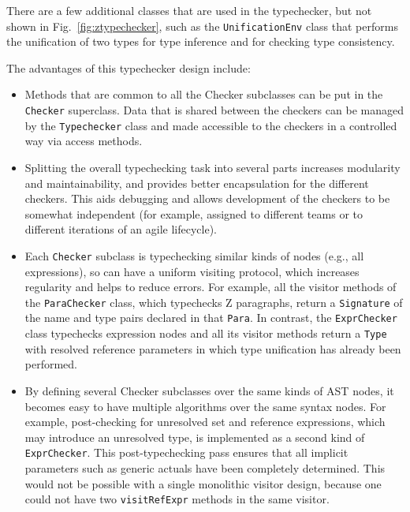 \documentclass{llncs}
\begin{document}
There are a few additional classes that are used in the typechecker,
but not shown in Fig.~\ref{fig:ztypechecker}, such as the
\texttt{UnificationEnv} class that performs
the unification of two types for type inference and for checking type
consistency.

The advantages of this typechecker design include:
\begin{itemize}

\item Methods that are common to all the Checker subclasses can be put in
  the \texttt{Checker} superclass.  Data that is shared between the checkers
  can be managed by the \texttt{Typechecker} class and made accessible
  to the checkers in a controlled way via access methods.

\item Splitting the overall typechecking task into several parts increases
  modularity and maintainability, and provides better encapsulation
  for the different checkers.  This aids debugging and allows development
  of the checkers to be somewhat independent (for example, assigned to
  different teams or to different iterations of an agile lifecycle).

\item Each \texttt{Checker} subclass is typechecking similar kinds of
  nodes (e.g., all expressions), so can have a uniform visiting
  protocol, which increases regularity and helps to reduce errors.
  For example, all the visitor methods of the
  \texttt{ParaChecker} class, which typechecks Z paragraphs, return a
  \texttt{Signature} of the name and type pairs declared in that
  \texttt{Para}.  In contrast, the \texttt{ExprChecker} class
  typechecks expression nodes and all its visitor methods return a
  \texttt{Type} with resolved reference parameters in which type
  unification has already been performed.

\item By defining several Checker subclasses over the same kinds of
  AST nodes, it becomes easy to have multiple algorithms over the same
  syntax nodes.  For example, post-checking for unresolved set and
  reference expressions, which may introduce an unresolved type, is
  implemented as a second kind of \texttt{ExprChecker}. This post-typechecking
  pass ensures that all implicit parameters such as generic actuals
  have been completely determined.  This would not be possible with a
  single monolithic visitor design, because one could not have two
  \texttt{visitRefExpr} methods in the same visitor.

\end{itemize}
\end{document}
